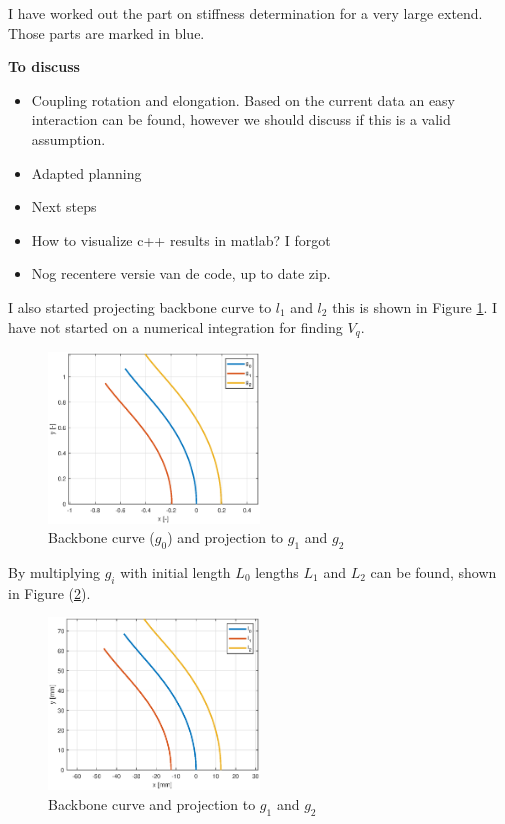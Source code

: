 I have worked out the part on stiffness determination for a very large extend. Those parts are marked in blue. 


\textbf{To discuss}
\begin{itemize}
    \item Coupling rotation and elongation. Based on the current data an easy interaction can be found, however we should discuss if this is a valid assumption.
    \item Adapted planning
    \item Next steps
    \item How to visualize c++ results in matlab? I forgot
    \item Nog recentere versie van de code, up to date zip.
    
\end{itemize}


I also started projecting backbone curve to $l_1$ and $l_2$ this is shown in Figure \ref{fig:progress}. I have not started on a numerical integration for finding $V_q$.


\begin{figure}[H]
    \centering
    \includegraphics[width = 0.5\textwidth]{Figures/ProgresFigures/g0g1g2.eps}
    \caption{Backbone curve ($g_0$) and projection to $g_1$ and $g_2$}
    \label{fig:progress} 
\end{figure}

By multiplying $g_i$ with initial length $L_0$ lengths $L_1$ and $L_2$ can be found, shown in Figure (\ref{fig:progress2}).

\begin{figure}[H]
    \centering
    \includegraphics[width = 0.5\textwidth]{Figures/ProgresFigures/l0l1l2.eps}
    \caption{Backbone curve and projection to $g_1$ and $g_2$}
    \label{fig:progress2} 
\end{figure}